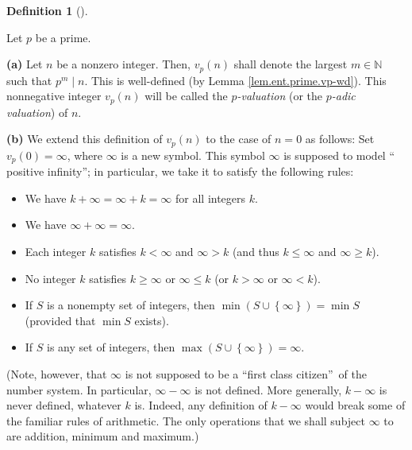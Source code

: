 \documentclass[numbers=enddot,12pt,final,onecolumn,notitlepage]{scrartcl}%
\numberwithin{exer}{subsection}
\theoremstyle{definition}
\newtheorem{defi}[theo]{Definition}
\newenvironment{definition}[1][]
{\begin{defi}[#1]\begin{leftbar}}
{\end{leftbar}\end{defi}}
\begin{document}
\begin{definition}
\label{def.ent.prime.vp}Let $p$ be a prime.

\textbf{(a)} Let $n$ be a nonzero integer. Then, $v_{p}\left(  n\right)  $
shall denote the largest $m\in\mathbb{N}$ such that $p^{m}\mid n$. This is
well-defined (by Lemma \ref{lem.ent.prime.vp-wd}). This nonnegative integer
$v_{p}\left(  n\right)  $ will be called the $p$\textit{-valuation} (or the
$p$\textit{-adic valuation}) of $n$.

\textbf{(b)} We extend this definition of $v_{p}\left(  n\right)  $ to the
case of $n=0$ as follows: Set $v_{p}\left(  0\right)  =\infty$, where $\infty$
is a new symbol. This symbol $\infty$ is supposed to model \textquotedblleft
positive infinity\textquotedblright; in particular, we take it to satisfy the
following rules:

\begin{itemize}
\item We have $k+\infty=\infty+k=\infty$ for all integers $k$.

\item We have $\infty+\infty=\infty$.

\item Each integer $k$ satisfies $k<\infty$ and $\infty>k$ (and thus
$k\leq\infty$ and $\infty\geq k$).

\item No integer $k$ satisfies $k\geq\infty$ or $\infty\leq k$ (or $k>\infty$
or $\infty<k$).

\item If $S$ is a nonempty set of integers, then $\min\left(  S\cup\left\{
\infty\right\}  \right)  =\min S$ (provided that $\min S$ exists).

\item If $S$ is any set of integers, then $\max\left(  S\cup\left\{
\infty\right\}  \right)  =\infty$.
\end{itemize}

(Note, however, that $\infty$ is not supposed to be a \textquotedblleft first
class citizen\textquotedblright\ of the number system. In particular,
$\infty-\infty$ is not defined. More generally, $k-\infty$ is never defined,
whatever $k$ is. Indeed, any definition of $k-\infty$ would break some of the
familiar rules of arithmetic. The only operations that we shall subject
$\infty$ to are addition, minimum and maximum.)
\end{definition}
\end{document}

